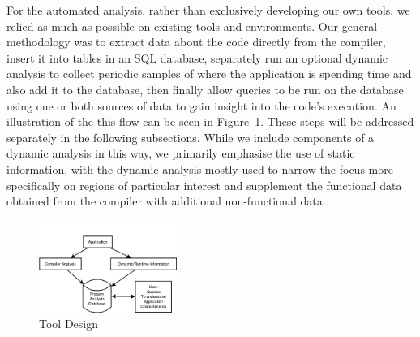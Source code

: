 For the automated analysis, rather than exclusively developing our own tools, we relied as much as possible on existing tools and environments.
Our general methodology was to extract data about the code directly from the compiler, insert it into tables in an \acs{SQL} database, separately run an optional dynamic analysis to collect periodic samples of where the application is spending time and also add it to the database, then finally allow queries to be run on the database using one or both sources of data to gain insight into the code's execution.
An illustration of the this flow can be seen in Figure~\ref{fig:design}.
These steps will be addressed separately in the following subsections.
While we include components of a dynamic analysis in this way, we primarily emphasise the use of static information, with the dynamic analysis mostly used to narrow the focus more specifically on regions of particular interest and supplement the functional data obtained from the compiler with additional non-functional data.

\begin{figure}
\begin{center}
\includegraphics[width=0.4\textwidth]{images/design.png}
\end{center}
\caption{Tool Design}
\label{fig:design}
\end{figure}

